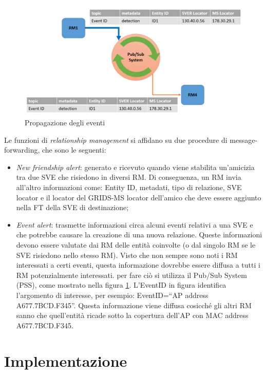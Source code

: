 \begin{figure}[h!t]
\centerline{\includegraphics[scale=0.5]{img/scambiomessaggi}}
\caption{Propagazione degli eventi}
\label{f:grids:scambiomex}
\end{figure}

Le funzioni di \textit{relationship management} si affidano su due procedure di message-forwarding, che sono le seguenti:
\begin{itemize}
    \item \textit{New friendship alert}: generato e ricevuto quando viene stabilita un'amicizia tra due SVE che risiedono in diversi RM. Di conseguenza, un RM invia all'altro informazioni come: Entity ID, metadati, tipo di relazione, SVE locator e il locator del GRIDS-MS locator dell'amico che deve essere aggiunto nella FT della SVE di destinazione;
    \item \textit{Event alert}: trasmette informazioni circa alcuni eventi relativi a una SVE e che potrebbe causare la creazione di una nuova relazione. Queste informazioni devono essere valutate dai RM delle entità coinvolte (o dal singolo RM se le SVE risiedono nello stesso RM). Visto che non sempre sono noti i RM interessati a certi eventi, questa informazione dovrebbe essere diffusa a tutti i RM potenzialmente interessati. per fare ciò si utilizza il Pub/Sub System (PSS), come mostrato nella figura \ref{f:grids:scambiomex}. L'EventID in figura identifica l'argomento di interesse, per esempio: EventID=“AP address A677.7BCD.F345”. Questa informazione viene diffusa cosicch\'e gli altri RM sanno che quell'entità ricade sotto la copertura dell'AP con MAC address A677.7BCD.F345.
\end{itemize}

\section{Implementazione}
\label{c:grids:implementation}

